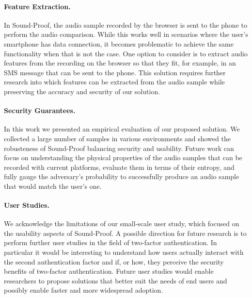 \paragraph{Feature Extraction.} In Sound-Proof, the audio sample recorded by the browser is sent to the phone to perform the audio comparison. While this works well in scenarios where the user's smartphone has data connection, it becomes problematic to achieve the same functionality when that is not the case. One option to consider is to extract audio features from the recording on the browser so that they fit, for example, in an SMS message that can be sent to the phone. This solution requires further research into which features can be extracted from the audio sample while preserving the accuracy and security of our solution.

\paragraph{Security Guarantees.} In this work we presented an empirical evaluation of our proposed solution. We collected a large number of samples in various environments and showed the robusteness of Sound-Proof balancing security and usability. Future work can focus on understanding the physical properties of the audio samples that can be recorded with current platforms, evaluate them in terms of their entropy, and fully gauge the adversary's probability to successfully produce an audio sample that would match the user's one.

\paragraph{User Studies.} We acknowledge the limitations of our small-scale user study, which focused on the usability aspects of Sound-Proof. A possible direction for future research is to perform further user studies in the field of two-factor authentication. In particular it would be interesting to understand how users actually interact with the second authentication factor and if, or how, they perceive the security benefits of two-factor authentication. Future user studies would enable researchers to propose solutions that better suit the needs of end users and possibly enable faster and more widespread adoption.

